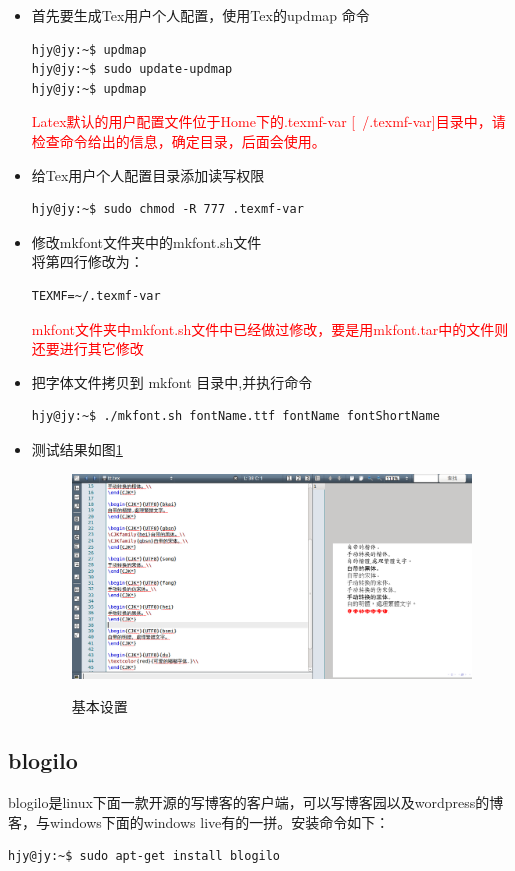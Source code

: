 \begin{itemize}
\item 首先要生成Tex用户个人配置，使用Tex的updmap 命令
\begin{lstlisting}[style=BASH]
hjy@jy:~$ updmap
hjy@jy:~$ sudo update-updmap
hjy@jy:~$ updmap
\end{lstlisting}
\textcolor{red}{Latex默认的用户配置文件位于Home下的.texmf-var [~/.texmf-var]目录中，请检查命令给出的信息，确定目录，后面会使用。}
\item 给Tex用户个人配置目录添加读写权限
\begin{lstlisting}[style=BASH]
hjy@jy:~$ sudo chmod -R 777 .texmf-var
\end{lstlisting}
\item 修改mkfont文件夹中的mkfont.sh文件\\
将第四行修改为：
\begin{lstlisting}[style=BASH]
TEXMF=~/.texmf-var
\end{lstlisting}
\textcolor{red}{mkfont文件夹中mkfont.sh文件中已经做过修改，要是用mkfont.tar中的文件则还要进行其它修改}
\item 把字体文件拷贝到 mkfont 目录中,并执行命令
\begin{lstlisting}[style=BASH]
hjy@jy:~$ ./mkfont.sh fontName.ttf fontName fontShortName
\end{lstlisting}
\item 测试结果如图\ref{fig:latex_fonts}
\begin{figure}[!htbp]
	\centering
	\caption{基本设置}  
		\includegraphics[scale=0.25]{figs/ubuntu_latex_fonts.png}
    	\label{fig:latex_fonts}
\end{figure}
\end{itemize}




\subsection{blogilo}
blogilo是linux下面一款开源的写博客的客户端，可以写博客园以及wordpress的博客，与windows下面的windows live有的一拼。安装命令如下：
\begin{lstlisting}[style=BASH]
hjy@jy:~$ sudo apt-get install blogilo
\end{lstlisting}

